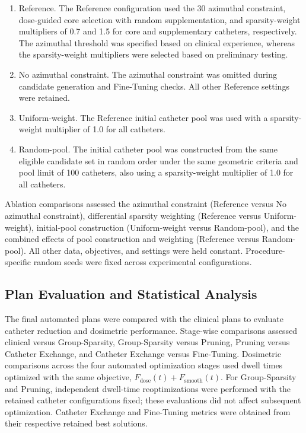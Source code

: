 \documentclass[12pt,twoside,letterpaper]{article}
\begin{document}
\begin{enumerate}
\item Reference. The Reference configuration used the 30\textdegree{} azimuthal constraint, dose-guided core selection with random supplementation, and sparsity-weight multipliers of 0.7 and 1.5 for core and supplementary catheters, respectively. The azimuthal threshold was specified based on clinical experience, whereas the sparsity-weight multipliers were selected based on preliminary testing.
\item No azimuthal constraint. The azimuthal constraint was omitted during candidate generation and Fine-Tuning checks. All other Reference settings were retained.
\item Uniform-weight. The Reference initial catheter pool was used with a sparsity-weight multiplier of 1.0 for all catheters.
\item Random-pool. The initial catheter pool was constructed from the same eligible candidate set in random order under the same geometric criteria and pool limit of 100 catheters, also using a sparsity-weight multiplier of 1.0 for all catheters.
\end{enumerate}

Ablation comparisons assessed the azimuthal constraint (Reference versus No azimuthal constraint), differential sparsity weighting (Reference versus Uniform-weight), initial-pool construction (Uniform-weight versus Random-pool), and the combined effects of pool construction and weighting (Reference versus Random-pool). All other data, objectives, and settings were held constant. Procedure-specific random seeds were fixed across experimental configurations.

\subsection{Plan Evaluation and Statistical Analysis}\label{sec:2-4}

The final automated plans were compared with the clinical plans to evaluate catheter reduction and dosimetric performance. Stage-wise comparisons assessed clinical versus Group-Sparsity, Group-Sparsity versus Pruning, Pruning versus Catheter Exchange, and Catheter Exchange versus Fine-Tuning. Dosimetric comparisons across the four automated optimization stages used dwell times optimized with the same objective, $F_{\text{dose}}\left( t \right) + F_{\text{smooth}}\left( t \right)$. For Group-Sparsity and Pruning, independent dwell-time reoptimizations were performed with the retained catheter configurations fixed; these evaluations did not affect subsequent optimization. Catheter Exchange and Fine-Tuning metrics were obtained from their respective retained best solutions.
\end{document}
